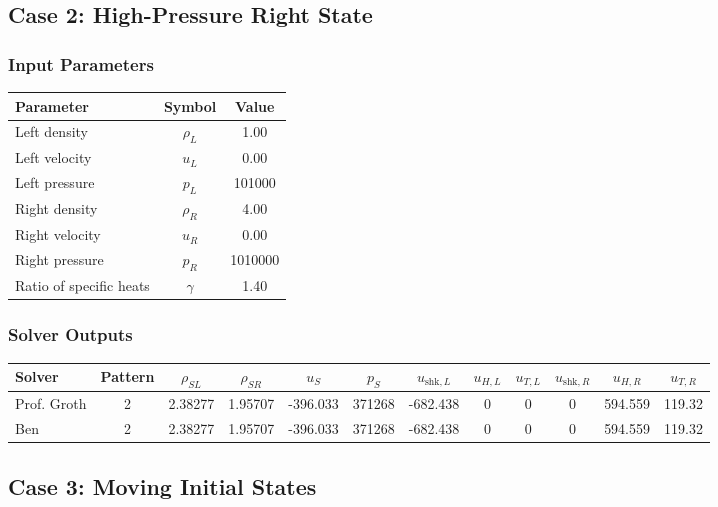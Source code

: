 \documentclass[11pt,landscape]{article}
\begin{document}
\subsection*{Case 2: High-Pressure Right State}

\subsubsection*{Input Parameters}

\begin{center}
\begin{tabular}{lcc}
\toprule
Parameter & Symbol & Value \\
\midrule
Left density & $\rho_L$ & 1.00 \\
Left velocity & $u_L$ & 0.00 \\
Left pressure & $p_L$ & 101000 \\
Right density & $\rho_R$ & 4.00 \\
Right velocity & $u_R$ & 0.00 \\
Right pressure & $p_R$ & 1010000 \\
Ratio of specific heats & $\gamma$ & 1.40 \\
\bottomrule
\end{tabular}
\end{center}

\subsubsection*{Solver Outputs}

\begin{center}
\small
\begin{tabular}{lccccccccccc}
\toprule
Solver & Pattern & $\rho_{SL}$ & $\rho_{SR}$ & $u_S$ & $p_S$
& $u_{\mathrm{shk},L}$ & $u_{H,L}$ & $u_{T,L}$
& $u_{\mathrm{shk},R}$ & $u_{H,R}$ & $u_{T,R}$ \\
\midrule
Prof. Groth & 2 & 2.38277 & 1.95707 & -396.033 & 371268
& -682.438 & 0 & 0 & 0 & 594.559 & 119.32 \\

Ben & 2 & 2.38277 & 1.95707 & -396.033 & 371268
& -682.438 & 0 & 0 & 0 & 594.559 & 119.32 \\
\bottomrule
\end{tabular}
\end{center}

\subsection*{Case 3: Moving Initial States}
\end{document}
